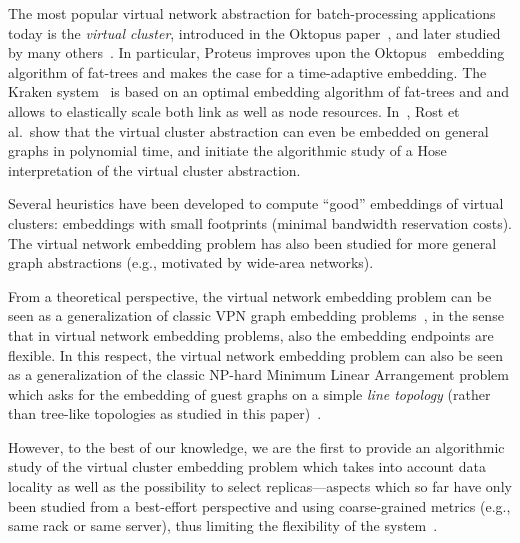 \documentclass[preprint,12pt]{elsarticle}
\begin{document}
The most popular virtual network abstraction for batch-processing applications today is the \emph{virtual cluster},
introduced in the Oktopus paper~\cite{oktopus}, and later studied by many others~\cite{talk-about,infocom16,ccr15emb,proteus}. In particular, Proteus \cite{proteus} improves
upon the Oktopus~\cite{oktopus} embedding algorithm of fat-trees and makes the case
for a time-adaptive embedding. The Kraken system~\cite{infocom16} is based on an optimal
embedding algorithm of fat-trees and and allows to elastically scale both link as well as
node resources. In~\cite{ccr15emb}, Rost et al.~show that the virtual cluster abstraction
can even be embedded on general graphs in polynomial time, and initiate the algorithmic study
of a Hose interpretation of the virtual cluster abstraction.

Several heuristics have been developed to compute ``good'' embeddings of virtual clusters: embeddings
with small footprints (minimal bandwidth reservation costs).
The virtual network embedding problem has also been studied for more general graph abstractions
(e.g., motivated by wide-area networks).~\cite{boutaba-survey,fischer-survey}


From a theoretical perspective, the virtual network embedding problem can be seen as a generalization
of classic VPN graph embedding problems~\cite{Goyal2008,gupta2001provisioning},
in the sense that in virtual network embedding problems, also the embedding endpoints are flexible. In this respect, the virtual network embedding problem can also be seen as a generalization of the
classic NP-hard Minimum Linear Arrangement problem which asks for the
embedding of guest graphs on a simple \emph{line topology} (rather than tree-like topologies as
studied in this paper)~\cite{mla,mla-survey}.

However, to the best of our knowledge, we are the first to provide an algorithmic
study of the virtual cluster embedding problem which takes into account
data locality as well as the possibility to select replicas---aspects which so far have only
been studied from a best-effort perspective and using coarse-grained metrics (e.g., same rack or same server), thus limiting the flexibility of the
system~\cite{local-schedule-1,local-schedule-2,local-schedule-3}.
\end{document}
